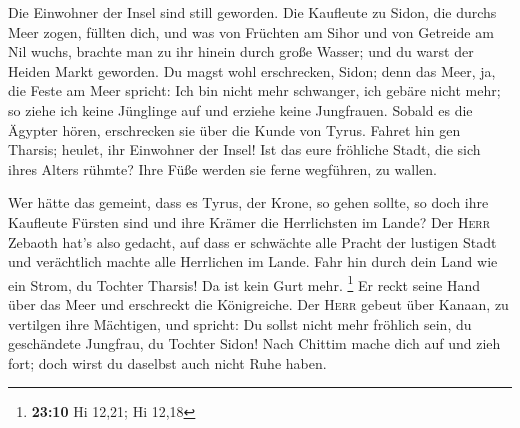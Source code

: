 Die Einwohner der Insel sind still geworden. Die
Kaufleute zu Sidon, die durchs Meer zogen, füllten dich, 
und was von Früchten am Sihor und von Getreide am Nil wuchs, brachte man
zu ihr hinein durch große Wasser; und du warst der Heiden Markt
geworden.  Du magst wohl erschrecken, Sidon; denn das
Meer, ja, die Feste am Meer spricht: Ich bin nicht mehr schwanger, ich
gebäre nicht mehr; so ziehe ich keine Jünglinge auf und erziehe keine
Jungfrauen.  Sobald es die Ägypter hören, erschrecken sie
über die Kunde von Tyrus.  Fahret hin gen Tharsis; heulet,
ihr Einwohner der Insel!  Ist das eure fröhliche Stadt,
die sich ihres Alters rühmte? Ihre Füße werden sie ferne wegführen, zu
wallen.

 Wer hätte das gemeint, dass es Tyrus, der Krone, so gehen
sollte, so doch ihre Kaufleute Fürsten sind und ihre Krämer die
Herrlichsten im Lande?  Der \textsc{Herr} Zebaoth hat's
also gedacht, auf dass er schwächte alle Pracht der lustigen Stadt und
verächtlich machte alle Herrlichen im Lande.  Fahr hin
durch dein Land wie ein Strom, du Tochter Tharsis! Da ist kein Gurt
mehr. \footnote{\textbf{23:10} Hi 12,21; Hi 12,18}  Er
reckt seine Hand über das Meer und erschreckt die Königreiche. Der
\textsc{Herr} gebeut über Kanaan, zu vertilgen ihre Mächtigen,
 und spricht: Du sollst nicht mehr fröhlich sein, du
geschändete Jungfrau, du Tochter Sidon! Nach Chittim mache dich auf und
zieh fort; doch wirst du daselbst auch nicht Ruhe haben.


